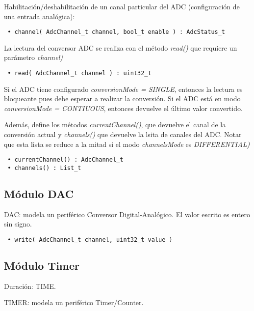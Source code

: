 Habilitación/deshabilitación de un canal particular del ADC (configuración de una entrada analógica):

\begin{verbatim}
 • channel( AdcChannel_t channel, bool_t enable ) : AdcStatus_t
\end{verbatim}

La lectura del conversor ADC se realiza con el método \emph{read()} que requiere un parámetro \emph{channel)}

\begin{verbatim}
 • read( AdcChannel_t channel ) : uint32_t
\end{verbatim}

Si el ADC tiene configurado \emph{conversionMode = SINGLE}, entonces la lectura es bloqueante pues debe esperar a realizar la conversión. Si el ADC está en modo \emph{conversionMode = CONTIUOUS}, entonces devuelve el último valor convertido.

Además, define los métodos \emph{currentChannel()}, que devuelve el canal de la conversión actual y \emph{channels()} que devuelve la lsita de canales del ADC. Notar que esta lista se reduce a la mitad si el modo \emph{channelsMode} es \emph{DIFFERENTIAL)}

\begin{verbatim}
 • currentChannel() : AdcChannel_t
 • channels() : List_t
\end{verbatim}

\subsection{Módulo DAC}


DAC: modela un periférico Conversor Digital-Analógico. El valor escrito es entero sin signo.



\begin{verbatim}
 • write( AdcChannel_t channel, uint32_t value )
\end{verbatim}

\subsection{Módulo Timer}
Duración: TIME.


TIMER: modela un periférico Timer/Counter.

